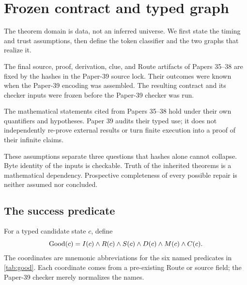 \section{Frozen contract and typed graph}
\label{sec:contract}

The theorem domain is data, not an inferred universe.  We first state the
timing and trust assumptions, then define the token classifier and the two
graphs that realize it.

\begin{assumption}
\label{ass:timing}
The final source, proof, derivation, clue, and Route artifacts of Papers
35--38 are fixed by the hashes in the Paper-39 source lock.  Their outcomes
were known when the Paper-39 encoding was assembled.  The resulting contract
and its checker inputs were frozen before the Paper-39 checker was run.
\end{assumption}

\begin{assumption}
\label{ass:predecessors}
The mathematical statements cited from Papers 35--38 hold under their own
quantifiers and hypotheses.  Paper 39 audits their typed use; it does not
independently re-prove external results or turn finite execution into a proof of
their infinite claims.
\end{assumption}

These assumptions separate three questions that hashes alone cannot collapse.
Byte identity of the inputs is checkable.  Truth of the inherited theorems is a
mathematical dependency.  Prospective completeness of every possible repair is
neither assumed nor concluded.

\subsection{The success predicate}

For a typed candidate state $c$, define
\begin{equation}
\operatorname{Good}(c)=I(c)\wedge R(c)\wedge S(c)\wedge D(c)\wedge M(c)\wedge C(c).
\label{eq:good}
\end{equation}
The coordinates are mnemonic abbreviations for the six named predicates in
\cref{tab:good}.  Each coordinate comes from a pre-existing Route or source
field; the Paper-39 checker merely normalizes the names.

